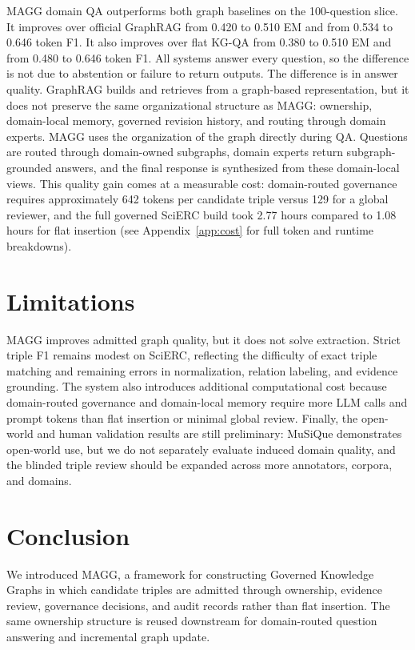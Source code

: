 \documentclass{article}
\newcommand{\system}{\textsc{MAGG}}
\begin{document}
\system{} domain QA outperforms both graph baselines on the 100-question slice. It improves over official GraphRAG from 0.420 to 0.510 EM and from 0.534 to 0.646 token F1. It also improves over flat KG-QA from 0.380 to 0.510 EM and from 0.480 to 0.646 token F1. All systems answer every question, so the difference is not due to abstention or failure to return outputs. The difference is in answer quality. GraphRAG builds and retrieves from a graph-based representation, but it does not preserve the same organizational structure as \system{}: ownership, domain-local memory, governed revision history, and routing through domain experts. \system{} uses the organization of the graph directly during QA. Questions are routed through domain-owned subgraphs, domain experts return subgraph-grounded answers, and the final response is synthesized from these domain-local views. This quality gain comes at a measurable cost: domain-routed governance requires approximately 642 tokens per candidate triple versus 129 for a global reviewer, and the full governed SciERC build took 2.77 hours compared to 1.08 hours for flat insertion (see Appendix~\ref{app:cost} for full token and runtime breakdowns).

\section{Limitations}

MAGG improves admitted graph quality, but it does not solve extraction. Strict triple F1 remains modest on SciERC, reflecting the difficulty of exact triple matching and remaining errors in normalization, relation labeling, and evidence grounding. The system also introduces additional computational cost because domain-routed governance and domain-local memory require more LLM calls and prompt tokens than flat insertion or minimal global review. Finally, the open-world and human validation results are still preliminary: MuSiQue demonstrates open-world use, but we do not separately evaluate induced domain quality, and the blinded triple review should be expanded across more annotators, corpora, and domains.

\section{Conclusion}

We introduced MAGG, a framework for constructing Governed Knowledge Graphs in which candidate triples are admitted through ownership, evidence review, governance decisions, and audit records rather than flat insertion. The same ownership structure is reused downstream for domain-routed question answering and incremental graph update.
\end{document}
